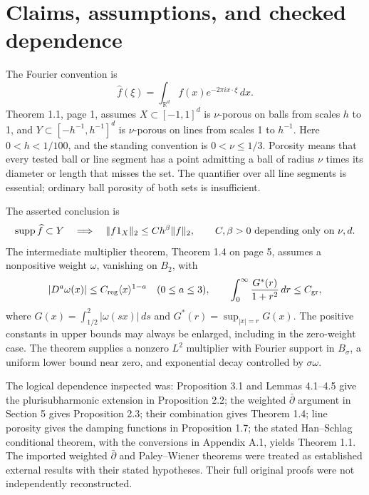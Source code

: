 \documentclass[10pt]{article}
\begin{document}
\section*{Claims, assumptions, and checked dependence}
The Fourier convention is \[\widehat f(\xi)=\int_{\mathbb R^d}f(x)e^{-2\pi i x\cdot\xi}\,dx.\] Theorem 1.1, page 1, assumes \(X\subset[-1,1]^d\) is \(\nu\)-porous on balls from scales \(h\) to 1, and \(Y\subset[-h^{-1},h^{-1}]^d\) is \(\nu\)-porous on lines from scales 1 to \(h^{-1}\). Here \(0<h<1/100\), and the standing convention is \(0<\nu\leq1/3\). Porosity means that every tested ball or line segment has a point admitting a ball of radius \(\nu\) times its diameter or length that misses the set. The quantifier over all line segments is essential; ordinary ball porosity of both sets is insufficient.\par
The asserted conclusion is \[\operatorname{supp}\widehat f\subset Y
 \quad\Longrightarrow\quad
 \|f1_X\|_2\leq C h^\beta\|f\|_2,
 \qquad C,\beta>0\ \hbox{depending only on }\nu,d.\] The intermediate multiplier theorem, Theorem 1.4 on page 5, assumes a nonpositive weight \(\omega\), vanishing on \(B_2\), with \[|D^a\omega(x)|\leq C_{\rm reg}\langle x\rangle^{1-a}\quad(0\leq a\leq3),
 \qquad
 \int_0^\infty\frac{G^*(r)}{1+r^2}\,dr\leq C_{\rm gr},\] where \(G(x)=\int_{1/2}^2|\omega(sx)|\,ds\) and \(G^*(r)=\sup_{|x|=r}G(x)\). The positive constants in upper bounds may always be enlarged, including in the zero-weight case. The theorem supplies a nonzero \(L^2\) multiplier with Fourier support in \(B_\sigma\), a uniform lower bound near zero, and exponential decay controlled by \(\sigma\omega\).\par
The logical dependence inspected was: Proposition 3.1 and Lemmas 4.1–4.5 give the plurisubharmonic extension in Proposition 2.2; the weighted \(\bar\partial\) argument in Section 5 gives Proposition 2.3; their combination gives Theorem 1.4; line porosity gives the damping functions in Proposition 1.7; the stated Han–Schlag conditional theorem, with the conversions in Appendix A.1, yields Theorem 1.1. The imported weighted \(\bar\partial\) and Paley–Wiener theorems were treated as established external results with their stated hypotheses. Their full original proofs were not independently reconstructed.\par
\end{document}
